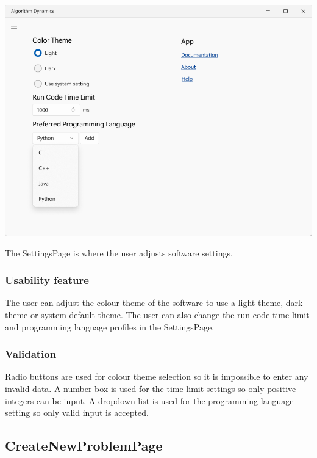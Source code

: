 \documentclass[a4paper]{report}
\begin{document}
\includegraphics[width=\textwidth, height=\textheight, keepaspectratio]{SettingsPage-design}

The SettingsPage is where the user adjusts software settings.

\subsubsection{Usability feature}

The user can adjust the colour theme of the software to use a light theme, dark theme or system default theme. The user can also change the run code time limit and programming language profiles in the SettingsPage.

\subsubsection{Validation}

Radio buttons are used for colour theme selection so it is impossible to enter any invalid data. A number box is used for the time limit settings so only positive integers can be input. A dropdown list is used for the programming language setting so only valid input is accepted.

\subsection{CreateNewProblemPage}
\end{document}

